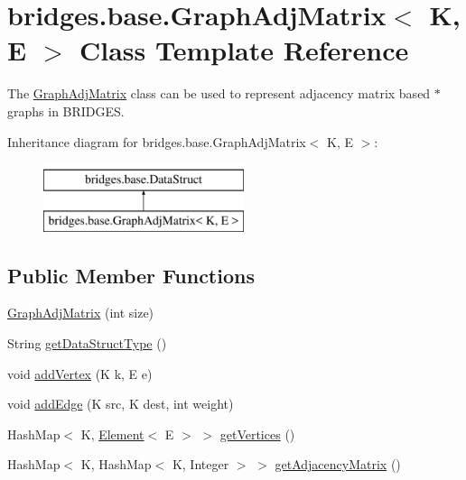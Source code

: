 \hypertarget{classbridges_1_1base_1_1_graph_adj_matrix}{}\section{bridges.\+base.\+Graph\+Adj\+Matrix$<$ K, E $>$ Class Template Reference}
\label{classbridges_1_1base_1_1_graph_adj_matrix}


The \hyperlink{classbridges_1_1base_1_1_graph_adj_matrix}{Graph\+Adj\+Matrix} class can be used to represent adjacency matrix based $\ast$ graphs in B\+R\+I\+D\+G\+ES.  


Inheritance diagram for bridges.\+base.\+Graph\+Adj\+Matrix$<$ K, E $>$\+:\begin{figure}[H]
\begin{center}
\leavevmode
\includegraphics[height=2.000000cm]{classbridges_1_1base_1_1_graph_adj_matrix}
\end{center}
\end{figure}
\subsection*{Public Member Functions}
\begin{DoxyCompactItemize}
\item 
\hyperlink{classbridges_1_1base_1_1_graph_adj_matrix_aaf71e89e2239d42f3ef37570665fb49d}{Graph\+Adj\+Matrix} (int size)
\item 
String \hyperlink{classbridges_1_1base_1_1_graph_adj_matrix_aa837a6bd0afbc700bf6277a062c5fdae}{get\+Data\+Struct\+Type} ()
\item 
void \hyperlink{classbridges_1_1base_1_1_graph_adj_matrix_a67d24d2ae069a8e1de6179ed58d7bca5}{add\+Vertex} (K k, E e)
\item 
void \hyperlink{classbridges_1_1base_1_1_graph_adj_matrix_af028f90cb574845cdddf9e5ec05130f8}{add\+Edge} (K src, K dest, int weight)
\item 
Hash\+Map$<$ K, \hyperlink{classbridges_1_1base_1_1_element}{Element}$<$ E $>$ $>$ \hyperlink{classbridges_1_1base_1_1_graph_adj_matrix_ac8270b3cbc4cf5f2f03c555ac6055423}{get\+Vertices} ()
\item 
Hash\+Map$<$ K, Hash\+Map$<$ K, Integer $>$ $>$ \hyperlink{classbridges_1_1base_1_1_graph_adj_matrix_a2bf0bf69333497b3b97788b74fe1f5b7}{get\+Adjacency\+Matrix} ()
\end{DoxyCompactItemize}
